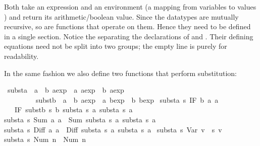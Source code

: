 \begin{isabellebody}
\begin{isamarkuptext}
Both take an expression and an environment (a mapping from variables
 to values ) and return its arithmetic/boolean
value. Since the datatypes are mutually recursive, so are functions
that operate on them. Hence they need to be defined in a single
 section. Notice the  separating
the declarations of  and . Their defining
equations need not be split into two groups;
the empty line is purely for readability.

In the same fashion we also define two functions that perform substitution:%
\end{isamarkuptext}%
\isamarkuptrue%
\isamarkupfalse%
\ substa\ {\isacharcolon}{\isacharcolon}\ {\isachardoublequoteopen}{\isacharparenleft}{\isacharprime}a\ {\isasymRightarrow}\ {\isacharprime}b\ aexp{\isacharparenright}\ {\isasymRightarrow}\ {\isacharprime}a\ aexp\ {\isasymRightarrow}\ {\isacharprime}b\ aexp{\isachardoublequoteclose}\ \isanewline
\ \ \ \ \ \ \ \ \ substb\ {\isacharcolon}{\isacharcolon}\ {\isachardoublequoteopen}{\isacharparenleft}{\isacharprime}a\ {\isasymRightarrow}\ {\isacharprime}b\ aexp{\isacharparenright}\ {\isasymRightarrow}\ {\isacharprime}a\ bexp\ {\isasymRightarrow}\ {\isacharprime}b\ bexp{\isachardoublequoteclose}\ \isanewline
{\isachardoublequoteopen}substa\ s\ {\isacharparenleft}IF\ b\ a{}\ a{}{\isacharparenright}\ {\isacharequal}\isanewline
\ \ \ IF\ {\isacharparenleft}substb\ s\ b{\isacharparenright}\ {\isacharparenleft}substa\ s\ a{}{\isacharparenright}\ {\isacharparenleft}substa\ s\ a{}{\isacharparenright}{\isachardoublequoteclose}\ {\isacharbar}\isanewline
{\isachardoublequoteopen}substa\ s\ {\isacharparenleft}Sum\ a{}\ a{}{\isacharparenright}\ {\isacharequal}\ Sum\ {\isacharparenleft}substa\ s\ a{}{\isacharparenright}\ {\isacharparenleft}substa\ s\ a{}{\isacharparenright}{\isachardoublequoteclose}\ {\isacharbar}\isanewline
{\isachardoublequoteopen}substa\ s\ {\isacharparenleft}Diff\ a{}\ a{}{\isacharparenright}\ {\isacharequal}\ Diff\ {\isacharparenleft}substa\ s\ a{}{\isacharparenright}\ {\isacharparenleft}substa\ s\ a{}{\isacharparenright}{\isachardoublequoteclose}\ {\isacharbar}\isanewline
{\isachardoublequoteopen}substa\ s\ {\isacharparenleft}Var\ v{\isacharparenright}\ {\isacharequal}\ s\ v{\isachardoublequoteclose}\ {\isacharbar}\isanewline
{\isachardoublequoteopen}substa\ s\ {\isacharparenleft}Num\ n{\isacharparenright}\ {\isacharequal}\ Num\ n{\isachardoublequoteclose}\ {\isacharbar}\isanewline

\end{isabellebody}
